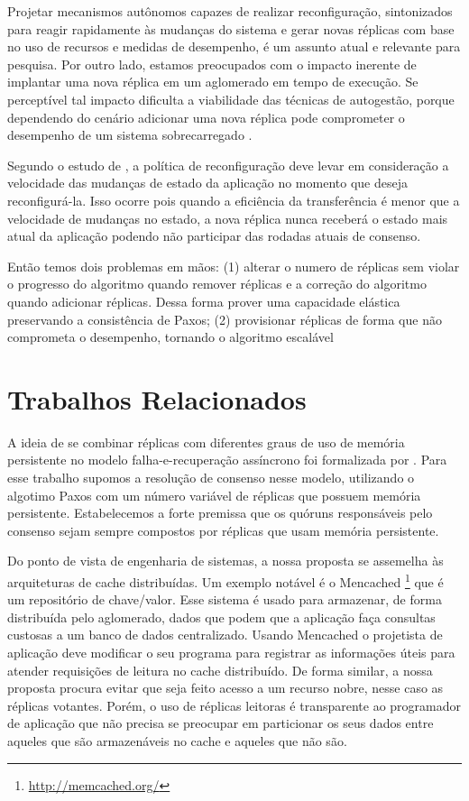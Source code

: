 Projetar mecanismos autônomos capazes de realizar reconfiguração, sintonizados para reagir
rapidamente às mudanças do sistema e gerar novas réplicas com base no uso de recursos e
medidas de desempenho, é um assunto atual e relevante para pesquisa. Por outro lado,
estamos preocupados com o impacto inerente de implantar uma nova réplica em um aglomerado
em tempo de execução. Se perceptível tal impacto dificulta a viabilidade das técnicas de
autogestão, porque dependendo do cenário adicionar uma nova réplica pode comprometer o
desempenho de um sistema sobrecarregado \cite{vilaca09}.

Segundo o estudo de , a política de reconfiguração deve levar em
consideração a velocidade das mudanças de estado da aplicação no momento que deseja
reconfigurá-la. Isso  ocorre  pois quando a eficiência da transferência é menor que a
velocidade de mudanças no estado, a nova réplica  nunca receberá o estado mais atual da
aplicação podendo não participar das rodadas atuais de consenso.

Então temos dois problemas em mãos: (1) alterar o numero de réplicas sem violar o
progresso do algoritmo quando remover réplicas e a correção do algoritmo quando adicionar
réplicas. Dessa forma prover uma capacidade elástica preservando a consistência de Paxos;
(2) provisionar réplicas de forma que não comprometa o desempenho, tornando o algoritmo
escalável


\section{Trabalhos Relacionados}\label{sec:trabalhos-relacionados}

A ideia de se combinar réplicas com diferentes graus de uso de memória persistente no
modelo falha-e-recuperação assíncrono foi formalizada por . Para
esse trabalho supomos a resolução de consenso nesse modelo, utilizando o algotimo Paxos
com um número variável de réplicas que possuem memória persistente. Estabelecemos a forte
premissa que os quóruns responsáveis pelo consenso sejam sempre compostos por réplicas que
usam memória persistente.

Do ponto de vista de engenharia de sistemas, a nossa proposta se assemelha às arquiteturas
de cache distribuídas. Um exemplo notável é o Mencached
\footnote{\url{http://memcached.org/}} que é um repositório de chave/valor. Esse sistema é
usado para armazenar, de forma distribuída pelo aglomerado, dados que podem que a
aplicação faça consultas custosas a um banco de dados centralizado. Usando Mencached o
projetista de aplicação deve modificar o seu programa para registrar as informações úteis
para atender requisições de leitura no cache distribuído. De forma similar, a nossa
proposta procura evitar que seja feito acesso a um recurso nobre, nesse caso as réplicas
votantes. Porém, o uso de réplicas leitoras é transparente ao programador de aplicação que
não precisa se preocupar em particionar os seus dados entre aqueles que são armazenáveis
no cache e aqueles que não são.


